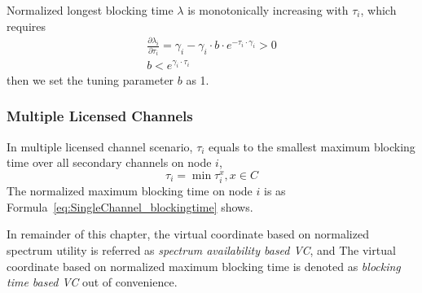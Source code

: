 
Normalized longest blocking time $\lambda$ is monotonically increasing with $\tau_i$, which requires
\begin{equation}
\begin{split}
\frac{\partial\lambda_i}{\partial\tau_i}=\gamma_i-\gamma_i\cdot b\cdot e^{-\tau_i\cdot \gamma_i}  >0\\
b  < e^{\gamma_i\cdot \tau_i}
\end{split}
\end{equation}
then we set the tuning parameter $b$ as 1.

\subsubsection{Multiple Licensed Channels}
In multiple licensed channel scenario, $\tau_i$ equals to the smallest maximum blocking time over all secondary channels on node $i$, 
\begin{equation}
\tau_i = \min \tau_i^x, x\in C
\end{equation}
The normalized maximum blocking time on node $i$ is as Formula~\ref{eq:SingleChannel_blockingtime} shows.





In remainder of this chapter, the virtual coordinate based on normalized spectrum utility is referred as \textit{spectrum availability based VC}, and The virtual coordinate based on normalized maximum blocking time is denoted as \textit{blocking time based VC} out of convenience.


